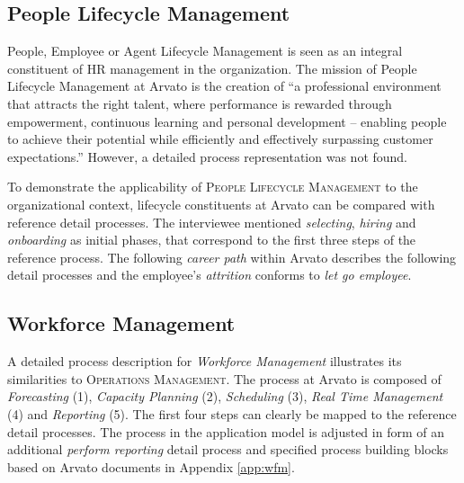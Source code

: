 	 
	\subsection{People Lifecycle Management}
	People, Employee or Agent Lifecycle Management is seen as an integral constituent of HR management in the organization. The mission of People Lifecycle Management at Arvato is the creation of \enquote{a professional environment that attracts the right talent, where performance is rewarded through empowerment, continuous learning and personal development – enabling people to achieve their potential while efficiently and effectively surpassing customer expectations.} However, a detailed process representation was not found. 
	
	To demonstrate the applicability of \textsc{People Lifecycle Management} to the organizational context, lifecycle constituents at Arvato can be compared with reference detail processes. The interviewee mentioned \textit{selecting}, \textit{hiring} and \textit{onboarding} as initial phases, that correspond to the first three steps of the reference process. The following \textit{career path} within Arvato describes the following detail processes and the employee's \textit{attrition} conforms to \textit{let go employee}.
	
	\subsection{Workforce Management}
	
	A detailed process description for \textit{Workforce Management} illustrates its similarities to \textsc{Operations Management}. The process at Arvato is composed of \textit{Forecasting} (1), \textit{Capacity Planning} (2), \textit{Scheduling} (3), \textit{Real Time Management} (4) and \textit{Reporting} (5). The first four steps can clearly be mapped to the reference detail processes. The process in the application model is adjusted in form of an additional \textit{perform reporting} detail process and specified process building blocks based on Arvato documents in Appendix \ref{app:wfm}.
	
	
	

	
	
